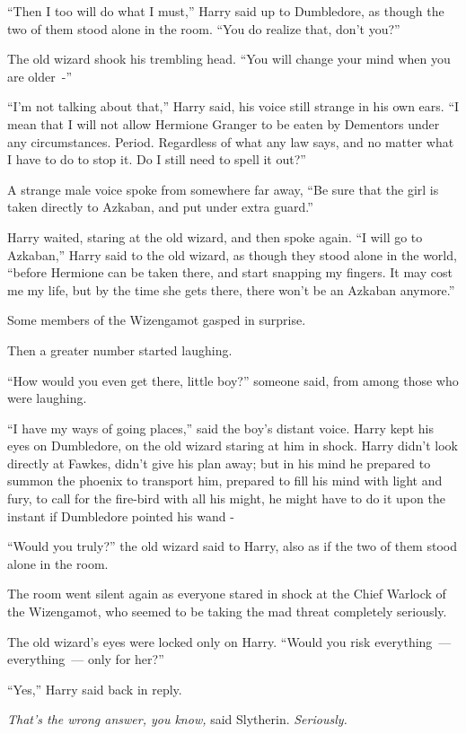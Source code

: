 ``Then I too will do what I must,'' Harry said up to Dumbledore, as though the two of them stood alone in the room. ``You do realize that, don't you?''

The old wizard shook his trembling head. ``You will change your mind when you are older~-''

``I'm not talking about that,'' Harry said, his voice still strange in his own ears. ``I mean that I will not allow Hermione Granger to be eaten by Dementors under any circumstances. Period. Regardless of what any law says, and no matter what I have to do to stop it. Do I still need to spell it out?''

A strange male voice spoke from somewhere far away, ``Be sure that the girl is taken directly to Azkaban, and put under extra guard.''

Harry waited, staring at the old wizard, and then spoke again. ``I will go to Azkaban,'' Harry said to the old wizard, as though they stood alone in the world, ``before Hermione can be taken there, and start snapping my fingers. It may cost me my life, but by the time she gets there, there won't be an Azkaban anymore.''

Some members of the Wizengamot gasped in surprise.

Then a greater number started laughing.

``How would you even get there, little boy?'' someone said, from among those who were laughing.

``I have my ways of going places,'' said the boy's distant voice. Harry kept his eyes on Dumbledore, on the old wizard staring at him in shock. Harry didn't look directly at Fawkes, didn't give his plan away; but in his mind he prepared to summon the phoenix to transport him, prepared to fill his mind with light and fury, to call for the fire-bird with all his might, he might have to do it upon the instant if Dumbledore pointed his wand -

``Would you truly?'' the old wizard said to Harry, also as if the two of them stood alone in the room.

The room went silent again as everyone stared in shock at the Chief Warlock of the Wizengamot, who seemed to be taking the mad threat completely seriously.

The old wizard's eyes were locked only on Harry. ``Would you risk everything~--- everything~--- only for her?''

``Yes,'' Harry said back in reply.

\emph{That's the wrong answer, you know,} said Slytherin. \emph{Seriously.}


